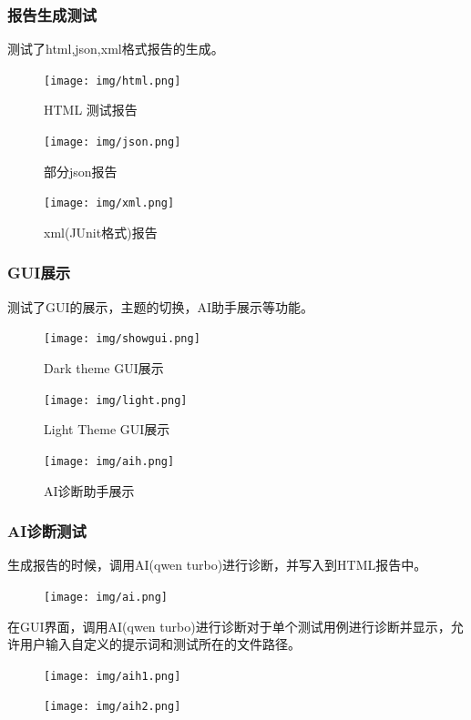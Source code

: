 \documentclass{article}
\begin{document}
\subsubsection{报告生成测试}

测试了html,json,xml格式报告的生成。
\begin{figure}[H]
    \centering
    \texttt{[image: img/html.png]}
    \caption{HTML 测试报告}
    \label{fig: 数据驱动 function test}
\end{figure}
\begin{figure}[H]
    \centering
    \texttt{[image: img/json.png]}
    \caption{部分json报告}
    \label{fig: 数据驱动 function test}
\end{figure}

\begin{figure}[H]
    \centering
    \texttt{[image: img/xml.png]}
    \caption{xml(JUnit格式)报告}
    \label{fig: 数据驱动 function test}
\end{figure}
\subsubsection{GUI展示}
测试了GUI的展示，主题的切换，AI助手展示等功能。
\begin{figure}[H]
    \centering
    \begin{minipage}{0.5\textwidth}
        \texttt{[image: img/showgui.png]}
        \caption{Dark theme GUI展示}
        \label{fig:showgui}
    \end{minipage}%
    \begin{minipage}{0.5\textwidth}
        \texttt{[image: img/light.png]}
        \caption{Light Theme GUI展示}
        \label{fig:light}
    \end{minipage}
\end{figure}
\begin{figure}[H]
    \centering
    \texttt{[image: img/aih.png]}
    \caption{AI诊断助手展示}
    \label{fig: 数据驱动 function test}
\end{figure}
\newpage
\subsubsection{AI诊断测试}
生成报告的时候，调用AI(qwen turbo)进行诊断，并写入到HTML报告中。
\begin{figure}[H]
    \centering
    \texttt{[image: img/ai.png]}
\end{figure}
在GUI界面，调用AI(qwen turbo)进行诊断对于单个测试用例进行诊断并显示，允许用户输入自定义的提示词和测试所在的文件路径。
\begin{figure}[H]
    \centering
    \begin{minipage}{0.45\textwidth}
        \texttt{[image: img/aih1.png]}
    \end{minipage}
    \hfill
    \begin{minipage}{0.45\textwidth}
        \texttt{[image: img/aih2.png]}
    \end{minipage}
\end{figure}
\end{document}
